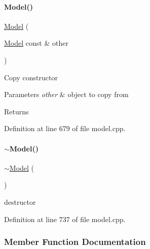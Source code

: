 \paragraph{\texorpdfstring{Model()}{Model()}\hspace{0.1cm}{\footnotesize\ttfamily [3/3]}}
{\footnotesize\ttfamily \mbox{\hyperlink{classamici_1_1_model}{Model}} (\begin{DoxyParamCaption}\item[{\mbox{\hyperlink{classamici_1_1_model}{Model}} const \&}]{other }\end{DoxyParamCaption})}

Copy constructor 
\begin{DoxyParams}{Parameters}
{\em other} & object to copy from \\
\hline
\end{DoxyParams}
\begin{DoxyReturn}{Returns}

\end{DoxyReturn}


Definition at line 679 of file model.\+cpp.

\mbox{\label{classamici_1_1_model_a252c349b237f7779edf32778eb541a99}} 
\paragraph{\texorpdfstring{$\sim$\+Model()}{~Model()}}
{\footnotesize\ttfamily $\sim$\mbox{\hyperlink{classamici_1_1_model}{Model}} (\begin{DoxyParamCaption}{ }\end{DoxyParamCaption})\hspace{0.3cm}{\ttfamily [virtual]}}

destructor 

Definition at line 737 of file model.\+cpp.



\subsubsection{Member Function Documentation}
\mbox{\label{classamici_1_1_model_abcf360cf2836a5c7a7686a6a5c0c6bfa}} 
